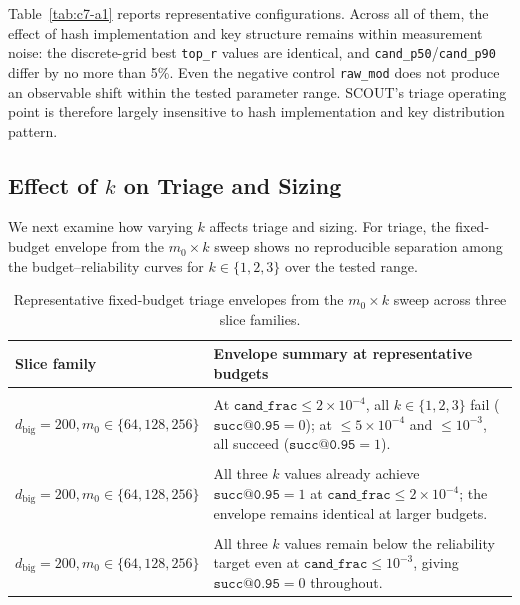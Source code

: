 Table~\ref{tab:c7-a1} reports representative configurations. Across all of them, the effect of hash implementation and key structure remains within measurement noise: the discrete-grid best \texttt{top\_r} values are identical, and \texttt{cand\_p50}/\texttt{cand\_p90} differ by no more than 5\%. Even the negative control \texttt{raw\_mod} does not produce an observable shift within the tested parameter range. SCOUT's triage operating point is therefore largely insensitive to hash implementation and key distribution pattern.

\subsection{Effect of $k$ on Triage and Sizing}

We next examine how varying $k$ affects triage and sizing. For triage, the fixed-budget envelope from the $m_0{\times}k$ sweep shows no reproducible separation among the budget--reliability curves for $k\in\{1,2,3\}$ over the tested range.



\begin{table}[!htbp]
\centering
\small
\begin{tabular}{p{}p{}}
\toprule
Slice family & Envelope summary at representative budgets \\
\midrule
\makecell[tl]{$P{=}10^6, L{=}8192, B{=}100,$\\$d_{\text{big}}{=}200, m_0\in\{64,128,256\}$} &
At $\texttt{cand\_frac}\le 2{\times}10^{-4}$, all $k\in\{1,2,3\}$ fail ($\texttt{succ@0.95}=0$); at $\le 5{\times}10^{-4}$ and $\le 10^{-3}$, all succeed ($\texttt{succ@0.95}=1$). \\
\addlinespace
\makecell[tl]{$P{=}10^6, L{=}32768, B{=}100,$\\$d_{\text{big}}{=}200, m_0\in\{64,128,256\}$} &
All three $k$ values already achieve $\texttt{succ@0.95}=1$ at $\texttt{cand\_frac}\le 2{\times}10^{-4}$; the envelope remains identical at larger budgets. \\
\addlinespace
\makecell[tl]{$P{=}10^3, L{=}65536, B{=}10,$\\$d_{\text{big}}{=}200, m_0\in\{64,128,256\}$} &
All three $k$ values remain below the reliability target even at $\texttt{cand\_frac}\le 10^{-3}$, giving $\texttt{succ@0.95}=0$ throughout. \\
\bottomrule
\end{tabular}
\caption{Representative fixed-budget triage envelopes from the $m_0{\times}k$ sweep across three slice families.}
\label{tab:c7-a3}
\end{table}




